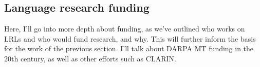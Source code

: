 

\subsection{Language research funding}

Here, I'll go into more depth about funding, as we've outlined who works on LRLs and who would fund research, and why. This will further inform the basis for the work of the previous section. I'll talk about DARPA MT funding in the 20th century, as well as other efforts such as CLARIN.


